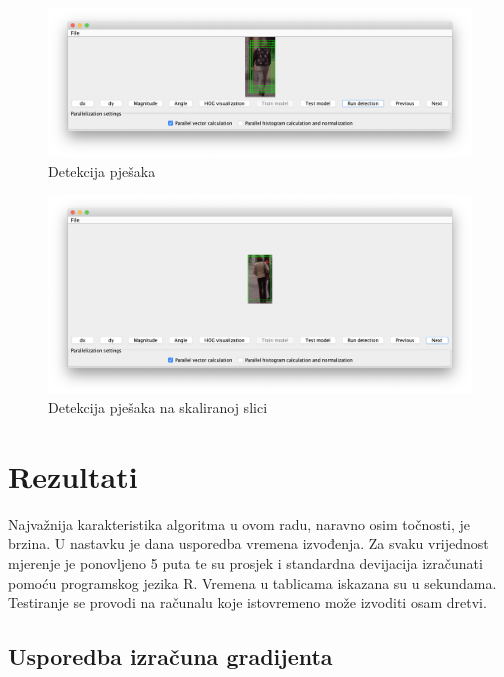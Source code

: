 \documentclass[times, utf8, zavrsni]{fer}
\begin{document}
\begin{figure}[htb]
	\centering
	\includegraphics[width=\linewidth]{figures/detection.png}
	\caption{Detekcija pješaka}
	\label{fig:detection}
\end{figure}

\begin{figure}[htb]
	\centering
	\includegraphics[width=\linewidth]{figures/scaledDetection.png}
	\caption{Detekcija pješaka na skaliranoj slici}
	\label{fig:scaledDetection}
\end{figure}

\chapter{Rezultati}
Najvažnija karakteristika algoritma u ovom radu, naravno osim točnosti, je brzina. U nastavku je dana usporedba vremena izvođenja. Za svaku vrijednost mjerenje je ponovljeno 5 puta te su prosjek i standardna devijacija izračunati pomoću programskog jezika R\footnotemark. Vremena u tablicama iskazana su u sekundama. Testiranje se provodi na računalu koje istovremeno može izvoditi osam dretvi. \\


\section{Usporedba izračuna gradijenta}
\end{document}
